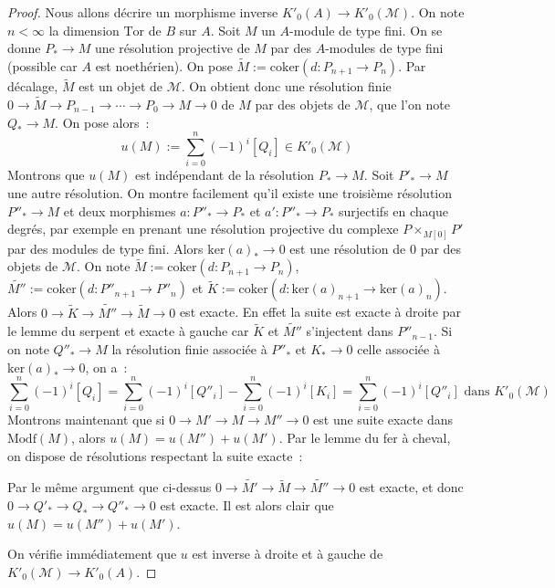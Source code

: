 \documentclass{amsart}
\theoremstyle{plain}
\theoremstyle{definition}
\theoremstyle{remark}
\newcommand{\Modf}[1]{\mathrm{Modf}({#1})}
\newcommand{\Tor}{\mathrm{Tor}}
\newcommand{\ra}{\rightarrow}
\newcommand{\exa}[3]{0\ra {#1}\ra {#2}\ra {#3}\ra 0}
\newcommand{\myker}[1]{\mathrm{ker}({#1})}
\newcommand{\coker}[1]{\mathrm{coker}({#1})}
\begin{document}
\begin{proof}
  Nous allons décrire un morphisme inverse $K'_0(A)\ra K'_0(\mathcal{M})$. On note $n<\infty$ la dimension $\Tor$ de $B$ sur $A$. Soit $M$ un $A$-module de type fini.
  On se donne $P_*\ra M$ une résolution projective de $M$ par des $A$-modules de type fini (possible car $A$ est noethérien).
  On pose $\tilde{M} := \coker{d:P_{n+1}\ra P_n}$. Par décalage, $\tilde{M}$ est un objet de $\mathcal{M}$.
  On obtient donc une résolution finie $0\ra \tilde{M}\ra P_{n-1}\ra \dotsb\ra P_0\ra M\ra 0$ de $M$ par des objets de $\mathcal{M}$, que l'on note $Q_*\ra M$.
  On pose alors~:
  $$u(M) := \sum_{i=0}^n (-1)^i[Q_i]\in K'_0(\mathcal{M})$$
  Montrons que $u(M)$ est indépendant de la résolution $P_*\ra M$. Soit $P'_*\ra M$ une autre résolution. On montre facilement qu'il existe une troisième
  résolution $P''_*\ra M$ et deux morphismes $a:P''_*\ra P_*$ et $a':P''_*\ra P_*$ surjectifs en chaque degrés, par exemple en prenant une résolution
  projective du complexe $P\times_{M[0]}P'$ par des modules de type fini.
  Alors $\myker{a}_*\ra 0$ est une résolution de $0$ par des objets de $\mathcal{M}$.
  On note $\tilde{M}:= \coker{d:P_{n+1}\ra P_n}$, $\tilde{M''}:= \coker{d:P''_{n+1}\ra P''_n}$ et $\tilde{K}:= \coker{d:\myker{a}_{n+1}\ra \myker{a}_n}$.
  Alors $\exa{\tilde{K}}{\tilde{M''}}{\tilde{M}}$ est exacte. En effet la suite est exacte à droite par le lemme du serpent et exacte à gauche car $\tilde{K}$ et
  $\tilde{M''}$ s'injectent dans $P''_{n-1}$. Si on note $Q''_*\ra M$ la résolution finie associée à $P''_*$ et $K_*\ra 0$ celle associée à $\myker{a}_*\ra 0$,
  on a~:
  $$\sum_{i=0}^n (-1)^i[Q_i]=\sum_{i=0}^n (-1)^i[Q''_i]-\sum_{i=0}^n (-1)^i[K_i]=\sum_{i=0}^n (-1)^i[Q''_i]\text{ dans }K'_0(\mathcal{M})$$
  Montrons maintenant que si $\exa{M'}{M}{M''}$ est une suite exacte dans $\Modf{M}$, alors $u(M) = u(M'')+u(M')$.
  Par le lemme du fer à cheval, on dispose de résolutions respectant la suite exacte~:
  \begin{center}
  \end{center}
  Par le même argument que ci-dessus $\exa{\tilde{M'}}{\tilde{M}}{\tilde{M''}}$ est exacte, et donc $\exa{Q'_*}{Q_*}{Q''_*}$ est exacte.
  Il est alors clair que $u(M) = u(M'')+u(M')$.

  On vérifie immédiatement que $u$ est inverse à droite et à gauche de $K'_0(\mathcal{M})\ra K'_0(A)$.
\end{proof}
\end{document}
